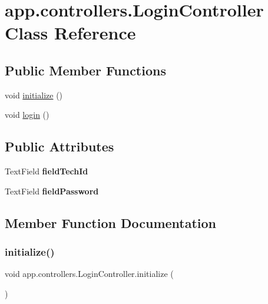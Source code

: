 \hypertarget{classapp_1_1controllers_1_1_login_controller}{}\section{app.\+controllers.\+Login\+Controller Class Reference}
\label{classapp_1_1controllers_1_1_login_controller}
\subsection*{Public Member Functions}
\begin{DoxyCompactItemize}
\item 
void \mbox{\hyperlink{classapp_1_1controllers_1_1_login_controller_aa342a8db861c23f873083658cefa7904}{initialize}} ()
\item 
void \mbox{\hyperlink{classapp_1_1controllers_1_1_login_controller_a89c1570ab24485594029d61f5c26e89d}{login}} ()
\end{DoxyCompactItemize}
\subsection*{Public Attributes}
\begin{DoxyCompactItemize}
\item 
\mbox{\label{classapp_1_1controllers_1_1_login_controller_ae589c9274f450e03ab51fc99bec305fc}} 
Text\+Field {\bfseries field\+Tech\+Id}
\item 
\mbox{\label{classapp_1_1controllers_1_1_login_controller_a72a9ac9556758086ac3b72bc46f30d1b}} 
Text\+Field {\bfseries field\+Password}
\end{DoxyCompactItemize}


\subsection{Member Function Documentation}
\mbox{\label{classapp_1_1controllers_1_1_login_controller_aa342a8db861c23f873083658cefa7904}} 
\subsubsection{\texorpdfstring{initialize()}{initialize()}}
{\footnotesize\ttfamily void app.\+controllers.\+Login\+Controller.\+initialize (\begin{DoxyParamCaption}{ }\end{DoxyParamCaption})}

